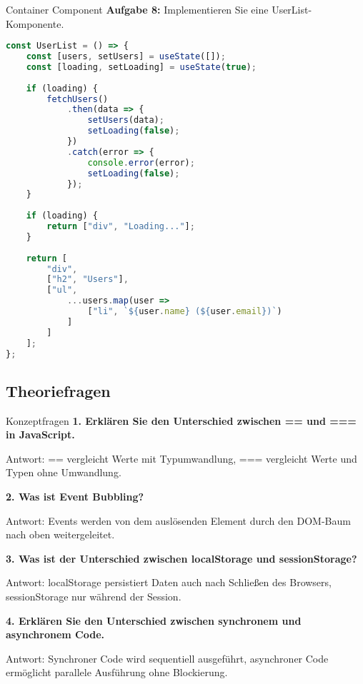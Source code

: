 \begin{example2}{Container Component}
    \textbf{Aufgabe 8:} Implementieren Sie eine UserList-Komponente.
    \begin{lstlisting}[language=JavaScript, style=basesmol]
const UserList = () => {
    const [users, setUsers] = useState([]);
    const [loading, setLoading] = useState(true);
    
    if (loading) {
        fetchUsers()
            .then(data => {
                setUsers(data);
                setLoading(false);
            })
            .catch(error => {
                console.error(error);
                setLoading(false);
            });
    }
    
    if (loading) {
        return ["div", "Loading..."];
    }
    
    return [
        "div",
        ["h2", "Users"],
        ["ul", 
            ...users.map(user => 
                ["li", `${user.name} (${user.email})`)
            ]
        ]
    ];
};
    \end{lstlisting}
\end{example2}

\subsection{Theoriefragen}

\begin{example2}{Konzeptfragen}
    \textbf{1. Erklären Sie den Unterschied zwischen == und === in JavaScript.}
    
    Antwort: == vergleicht Werte mit Typumwandlung, === vergleicht Werte und Typen ohne Umwandlung.
    
    \textbf{2. Was ist Event Bubbling?}
    
    Antwort: Events werden von dem auslösenden Element durch den DOM-Baum nach oben weitergeleitet.
    
    \textbf{3. Was ist der Unterschied zwischen localStorage und sessionStorage?}
    
    Antwort: localStorage persistiert Daten auch nach Schließen des Browsers, sessionStorage nur während der Session.
    
    \textbf{4. Erklären Sie den Unterschied zwischen synchronem und asynchronem Code.}
    
    Antwort: Synchroner Code wird sequentiell ausgeführt, asynchroner Code ermöglicht parallele Ausführung ohne Blockierung.
\end{example2}

